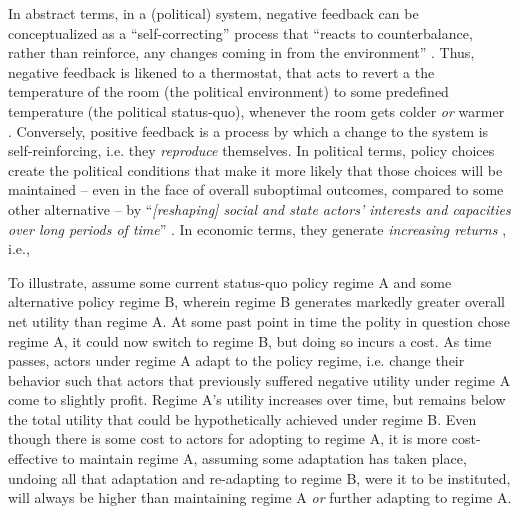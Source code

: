\documentclass[11pt, xcolor=dvipsnames]{article}
\begin{document}
In abstract terms, in a (political) system, negative feedback can be conceptualized as a \enquote{self-correcting} \parencite[][p. 8]{Baumgartner2002} process that \enquote{reacts to counterbalance, rather than reinforce, any changes coming in from the environment} . Thus, negative feedback is likened to a thermostat, that acts to revert a the temperature of the room (the political environment) to some predefined temperature (the political status-quo), whenever the room gets colder \textit{or} warmer \parencite[][]{Wlezien1995}. Conversely, positive feedback is a process by which a change to the system is self-reinforcing, i.e. they \textit{reproduce} themselves. In political terms, policy choices create the political conditions that make it more likely that those choices will be maintained -- even in the face of overall suboptimal outcomes, compared to some other alternative -- by \enquote{\textit{[reshaping] social and state actors' interests and capacities over long periods of time}} \parencite[][p. 443, original emphasis]{Jacobs2014}. In economic terms, they generate \textit{increasing returns} \parencite[also see][]{Krasner1988}, i.e.,

To illustrate, assume some current status-quo policy regime A and some alternative policy regime B, wherein regime B generates markedly greater overall net utility than regime A. At some past point in time the polity in question chose regime A, it could now switch to regime B, but doing so incurs a cost. As time passes, actors under regime A adapt to the policy regime, i.e. change their behavior such that actors that previously suffered negative utility under regime A come to slightly profit. Regime A's utility increases over time, but remains below the total utility that could be hypothetically achieved under regime B. Even though there is some cost to actors for adopting to regime A, it is more cost-effective to maintain regime A, assuming some adaptation has taken place, undoing all that adaptation and re-adapting to regime B, were it to be instituted, will always be higher than maintaining regime A \textit{or} further adapting to regime A. 
\end{document}
